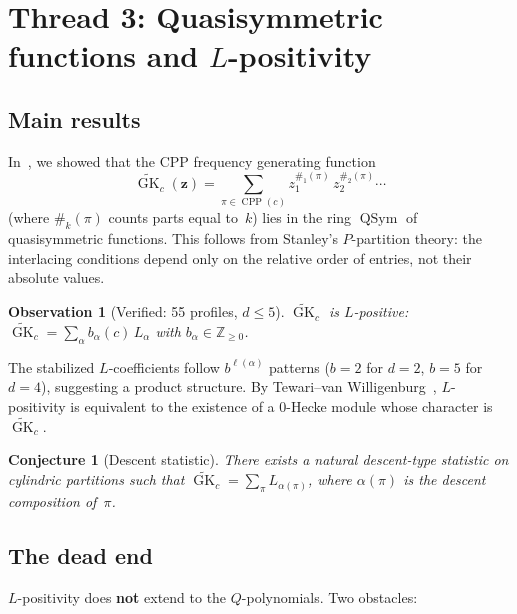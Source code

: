 \documentclass[11pt]{article}
\newtheorem{conjecture}[theorem]{Conjecture}
\newtheorem{observation}[theorem]{Observation}
\newcommand{\CPP}{\operatorname{CPP}}
\newcommand{\GK}{\operatorname{GK}}
\newcommand{\QSym}{\operatorname{QSym}}
\begin{document}
\section{Thread 3: Quasisymmetric functions and $L$-positivity}
\label{sec:qsym}

\subsection{Main results}

In~\cite{langer-qsym}, we showed that the CPP frequency
generating function
\[
  \widetilde{\GK}_c(\mathbf{z})
  = \sum_{\pi \in \CPP(c)}
    z_1^{\#_1(\pi)}\, z_2^{\#_2(\pi)} \cdots
\]
(where $\#_k(\pi)$ counts parts equal to~$k$) lies in the ring
$\QSym$ of quasisymmetric functions. This follows from Stanley's
$P$-partition theory: the interlacing conditions depend only on
the relative order of entries, not their absolute values.

\begin{observation}[Verified: 55 profiles, $d \leq 5$]
$\widetilde{\GK}_c$ is $L$-positive:
$\widetilde{\GK}_c = \sum_\alpha b_\alpha(c)\, L_\alpha$
with $b_\alpha \in \mathbb{Z}_{\geq 0}$.
\end{observation}

The stabilized $L$-coefficients follow $b^{\ell(\alpha)}$
patterns ($b = 2$ for $d = 2$, $b = 5$ for $d = 4$), suggesting
a product structure. By Tewari--van Willigenburg~\cite{tvw-2015},
$L$-positivity is equivalent to the existence of a $0$-Hecke
module whose character is $\widetilde{\GK}_c$.

\begin{conjecture}[Descent statistic]
There exists a natural descent-type statistic on cylindric
partitions such that
$\widetilde{\GK}_c = \sum_\pi L_{\alpha(\pi)}$,
where $\alpha(\pi)$ is the descent composition of~$\pi$.
\end{conjecture}

\subsection{The dead end}

$L$-positivity does \textbf{not} extend to the $Q$-polynomials.
Two obstacles:
\end{document}
